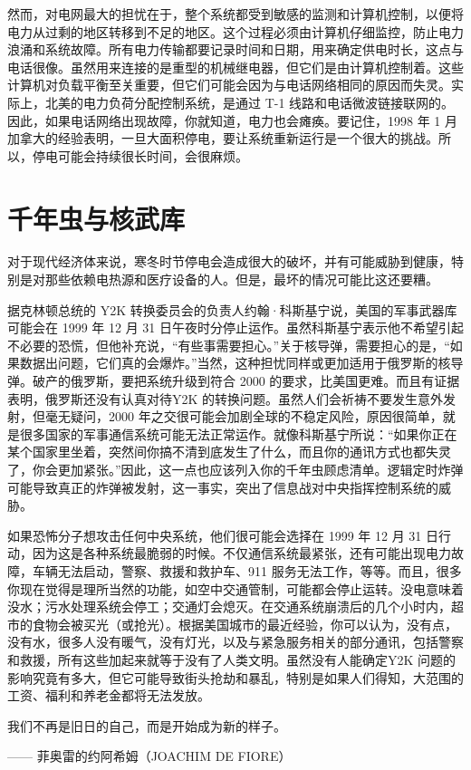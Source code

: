 然而，对电网最大的担忧在于，整个系统都受到敏感的监测和计算机控制，以便将电力从过剩的地区转移到不足的地区。这个过程必须由计算机仔细监控，防止电力浪涌和系统故障。所有电力传输都要记录时间和日期，用来确定供电时长，这点与电话很像。虽然用来连接的是重型的机械继电器，但它们是由计算机控制着。这些计算机对负载平衡至关重要，但它们可能会因为与电话网络相同的原因而失灵。实际上，北美的电力负荷分配控制系统，是通过 T-1 线路和电话微波链接联网的。因此，如果电话网络出现故障，你就知道，电力也会瘫痪。要记住，1998 年 1 月加拿大的经验表明，一旦大面积停电，要让系统重新运行是一个很大的挑战。所以，停电可能会持续很长时间，会很麻烦。


\section{千年虫与核武库}
对于现代经济体来说，寒冬时节停电会造成很大的破坏，并有可能威胁到健康，特别是对那些依赖电热源和医疗设备的人。但是，最坏的情况可能比这还要糟。


据克林顿总统的 Y2K 转换委员会的负责人约翰·科斯基宁说，美国的军事武器库可能会在 1999 年 12 月 31 日午夜时分停止运作。虽然科斯基宁表示他不希望引起不必要的恐慌，但他补充说，“有些事需要担心。”关于核导弹，需要担心的是，“如果数据出问题，它们真的会爆炸。”当然，这种担忧同样或更加适用于俄罗斯的核导弹。破产的俄罗斯，要把系统升级到符合 2000 的要求，比美国更难。而且有证据表明，俄罗斯还没有认真对待Y2K 的转换问题。虽然人们会祈祷不要发生意外发射，但毫无疑问，2000 年之交很可能会加剧全球的不稳定风险，原因很简单，就是很多国家的军事通信系统可能无法正常运作。就像科斯基宁所说：“如果你正在某个国家里坐着，突然间你搞不清到底发生了什么，而且你的通讯方式也都失灵了，你会更加紧张。”因此，这一点也应该列入你的千年虫顾虑清单。逻辑定时炸弹可能导致真正的炸弹被发射，这一事实，突出了信息战对中央指挥控制系统的威胁。


如果恐怖分子想攻击任何中央系统，他们很可能会选择在 1999 年 12 月 31 日行动，因为这是各种系统最脆弱的时候。不仅通信系统最紧张，还有可能出现电力故障，车辆无法启动，警察、救援和救护车、911 服务无法工作，等等。而且，很多你现在觉得是理所当然的功能，如空中交通管制，可能都会停止运转。没电意味着没水；污水处理系统会停工；交通灯会熄灭。在交通系统崩溃后的几个小时内，超市的食物会被买光（或抢光）。根据美国城市的最近经验，你可以认为，没有点，没有水，很多人没有暖气，没有灯光，以及与紧急服务相关的部分通讯，包括警察和救援，所有这些加起来就等于没有了人类文明。虽然没有人能确定Y2K 问题的影响究竟有多大，但它可能导致街头抢劫和暴乱，特别是如果人们得知，大范围的工资、福利和养老金都将无法发放。


\begin{tcolorbox}
\kaishu 我们不再是旧日的自己，而是开始成为新的样子。
\begin{flushright}
—— 菲奥雷的约阿希姆（JOACHIM DE FIORE）
\end{flushright}
\end{tcolorbox}


